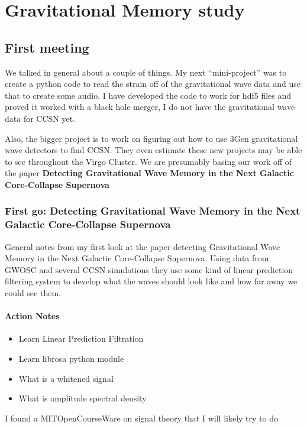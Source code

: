 \chapter{Gravitational Memory study}

\section{First meeting}

We talked in general about a couple of things. My next ``mini-project'' was to create a python code to read the strain off of the gravitational wave data and use that to create some audio. I have developed the code to work for hdf5 files and proved it worked with a black hole merger, I do not have the gravitational wave data for CCSN yet.

Also, the bigger project is to work on figuring out how to use 3Gen gravitational wave detectors to find CCSN. They even estimate these new projects may be able to see throughout the Virgo Cluster. We are presumably basing our work off of the paper \textbf{Detecting Gravitational Wave Memory in the Next Galactic Core-Collapse Supernova}

\subsection{First go: Detecting Gravitational Wave Memory in the Next Galactic Core-Collapse Supernova}

General notes from my first look at the paper detecting Gravitational Wave Memory in the Next Galactic Core-Collapse Supernova. Using data from GWOSC and several CCSN simulations they use some kind of linear prediction filtering system to develop what the waves should look like and how far away we could see them.

\subsubsection{Action Notes}

\begin{itemize}
	\item Learn Linear Prediction Filtration
	\item Learn librosa python module
	\item What is a whitened signal
	\item What is amplitude spectral density
\end{itemize}

I found a MITOpenCourseWare on signal theory that I will likely try to do

